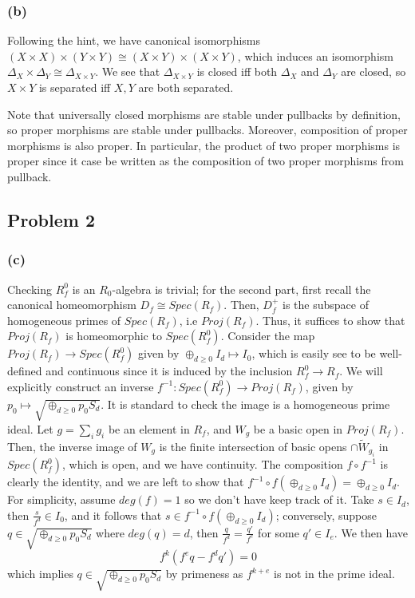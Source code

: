 \documentclass{article}
\theoremstyle{definition}
\theoremstyle{definition}
\theoremstyle{definition}
\theoremstyle{definition}
\theoremstyle{definition}
\theoremstyle{definition}
\theoremstyle{definition}
\begin{document}
\subsubsection*{(b)}
Following the hint, we have canonical isomorphisms $(X\times X)\times (Y\times Y)\cong (X\times Y)\times (X\times Y)$, which induces an isomorphism $\Delta_X\times \Delta_Y\cong \Delta_{X\times Y}$. We see that $\Delta_{X\times Y}$ is closed iff both $\Delta_X$ and $\Delta_Y$ are closed, so $X\times Y$ is separated iff $X,Y$ are both separated. 

Note that universally closed morphisms are stable under pullbacks by definition, so proper morphisms are stable under pullbacks. Moreover, composition of proper morphisms is also proper. In particular, the product of two proper morphisms is proper since it case be written as the composition of two proper morphisms from pullback.

\subsection*{Problem 2}
\subsubsection*{(c)}
Checking $R_f^0$ is an $R_0$-algebra is trivial; for the second part, first recall the canonical homeomorphism $D_f\cong Spec(R_f)$. Then, $D_f^+$ is the subspace of homogeneous primes of $Spec(R_f)$, i.e $Proj(R_f)$. Thus, it suffices to show that $Proj(R_f)$ is homeomorphic to $Spec(R_f^0)$. Consider the map 
$Proj(R_f)\to Spec(R_f^0)$ given by $\oplus_{d\geq 0}I_d\mapsto I_0$, which is easily see to be well-defined and continuous since it is induced by the inclusion $R_f^0\to R_f$. We will explicitly construct an inverse $f^{-1}: Spec(R_f^0)\to Proj(R_f)$, given by $p_0\mapsto \sqrt{\oplus_{d\geq 0} p_0S_d}$. It is standard to check the image is a homogeneous prime ideal. Let $g=\sum_i g_i$ be an element in $R_f$, and $W_g$ be a basic open in $Proj(R_f)$. Then, the inverse image of $W_g$ is the finite intersection of basic opens $\cap \tilde{W}_{g_i}$ in $Spec(R_f^0)$, which is open, and we have continuity. The composition $f\circ f^{-1}$ is clearly the identity, and we are left to show that $f^{-1}\circ f(\oplus_{d\geq 0} I_d)=\oplus_{d\geq 0} I_d$. For simplicity, assume $deg(f)=1$ so we don't have keep track of it. Take $s\in I_d$, then $\frac{s}{f^d}\in I_0$, and it follows that $s\in f^{-1}\circ f(\oplus_{d\geq 0} I_d)$; conversely, suppose $q\in  \sqrt{\oplus_{d\geq 0} p_0S_d}$ where $deg(q)=d$, then $\frac{q}{f^d}=\frac{q'}{f^{e}}$ for some $q'\in I_e$. We then have 
\[f^k(f^eq-f^dq')=0\]
which implies $q\in \sqrt{\oplus_{d\geq 0} p_0S_d}$ by primeness as $f^{k+e}$ is not in the prime ideal.
\end{document}
